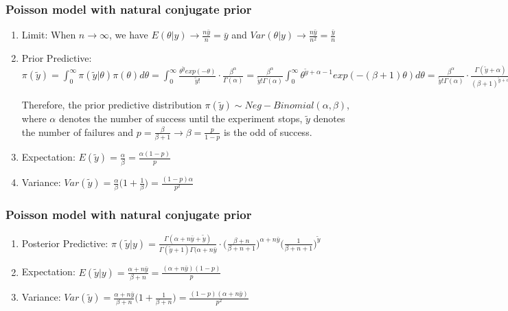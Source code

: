 \documentclass{beamer}
\begin{document}
\begin{frame}
\frametitle{Poisson model with natural conjugate prior}

\begin{enumerate}
\item Limit: When $n\rightarrow \infty$, we have $E(\theta|y) \rightarrow \frac{n\bar y}{n} = \bar y$ and $Var(\theta|y) \rightarrow \frac{n\bar y}{n^2} = \frac{\bar y}{n}$
\item Prior Predictive: $\pi(\tilde y) = \int_0^{\infty} \pi(\tilde y|\theta)\pi(\theta) d\theta = \int_0^{\infty} \frac{\theta^{\tilde y} exp(-\theta)}{\tilde y!} \cdot \frac{\beta^{\alpha}}{\Gamma(\alpha)} = \frac{\beta^{\alpha}}{\tilde y! \Gamma(\alpha)} \int_0^{\infty} \theta^{\tilde y + \alpha -1} exp(-(\beta+1)\theta) d\theta = \frac{\beta^{\alpha}}{\tilde y! \Gamma(\alpha)} \cdot \frac{\Gamma(\tilde y + \alpha)}{(\beta+1)^{\tilde y + \alpha}} = \frac{(\tilde y + \alpha -1)!}{\tilde y! (\alpha -1)!} \cdot \Big(\frac{\beta}{\beta+1}\Big)^{\alpha} \cdot \Big(\frac{1}{\beta+1}\Big)^{\tilde y} = {{\tilde y + \alpha -1}\choose{\alpha -1}} \Big(\frac{\beta}{\beta+1}\Big)^{\alpha} \cdot \Big(\frac{1}{\beta+1}\Big)^{\tilde y}$

Therefore, the prior predictive distribution $\pi(\tilde y) \sim Neg-Binomial(\alpha,\beta)$, where $\alpha$ denotes the number of success until the experiment stops, $\tilde y$ denotes the number of failures and $p = \frac{\beta}{\beta+1} \rightarrow \beta = \frac{p}{1-p}$ is the odd of success.

\item Expectation: $E(\tilde y) = \frac{\alpha}{\beta} = \frac{\alpha (1-p)}{p}$
\item Variance: $Var(\tilde y) = \frac{\alpha}{\beta}\Big(1 + \frac{1}{\beta}\Big) = \frac{(1-p)\alpha}{p^2}$

\end{enumerate}

\end{frame}



\begin{frame}
\frametitle{Poisson model with natural conjugate prior}

\begin{enumerate}
\item Posterior Predictive: $\pi(\tilde y|y) = \frac{\Gamma(\alpha + n\bar y + \tilde y)}{\Gamma(\tilde y+1) \Gamma(\alpha+n \bar y} \cdot \Big(\frac{\beta+n}{\beta+n+1}\Big)^{\alpha + n\bar y} \Big(\frac{1}{\beta+n+1}\Big)^{\tilde y}$

\item Expectation: $E(\tilde y|y) = \frac{\alpha + n \bar y}{\beta+n} = \frac{(\alpha + n\bar y) (1-p)}{p}$
\item Variance: $Var(\tilde y) = \frac{\alpha+n \bar y}{\beta+n}\Big(1 + \frac{1}{\beta+n}\Big) = \frac{(1-p)(\alpha+n \bar y)}{p^2}$

\end{enumerate}

\end{frame}
\end{document}
